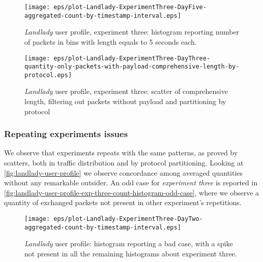 \documentclass[10pt,a4paper]{article}
\begin{document}
    \begin{figure}
      \centering
      \texttt{[image: eps/plot-Landlady-ExperimentThree-DayFive-aggregated-count-by-timestamp-interval.eps]}
      \caption{\emph{Landlady} user profile, experiment three: histogram
        reporting number of packets in bins with length equals to 5
        seconds each.}
      \label{fig:landlady-user-profile-exp-three-count-histogram}
    \end{figure}

    \begin{figure}
      \centering
      \texttt{[image: eps/plot-Landlady-ExperimentThree-DayThree-quantity-only-packets-with-payload-comprehensive-length-by-protocol.eps]}
      \caption{\emph{Landlady} user profile, experiment three: scatter
        of comprehensive length, filtering out packets without payload
        and partitioning by protocol}
      \label{fig:landlady-user-profile-exp-three-comprehensive-length-by-protocol}
    \end{figure}



    \subsubsection*{Repeating experiments issues}
    
    We observe that experiments repeats with the same patterns, as
    proved by scatters, both in traffic distribution and by protocol
    partitioning. Looking at \autoref{fig:landlady-user-profile} we
    observe concordance among averaged quantities without any
    remarkable outsider. An odd case for \emph{experiment three} is
    reported in
    \autoref{fig:landlady-user-profile-exp-three-count-histogram-odd-case},
    where we observe a quantity of exchanged packets not present in
    other experiment's repetitions.

    \begin{figure}
      \centering
      \texttt{[image: eps/plot-Landlady-ExperimentThree-DayTwo-aggregated-count-by-timestamp-interval.eps]}
      \caption{\emph{Landlady} user profile: histogram reporting a bad
        case, with a spike not present in all the remaining histograms
        about experiment three.}
      \label{fig:landlady-user-profile-exp-three-count-histogram-odd-case}
    \end{figure}
\end{document}
